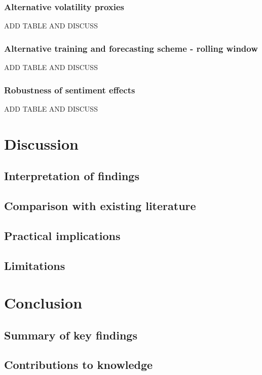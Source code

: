 \documentclass[12pt]{report}
\begin{document}
\subsection{Alternative volatility proxies}
%
ADD TABLE AND DISCUSS
\subsection{Alternative training and forecasting scheme - rolling window}
%
ADD TABLE AND DISCUSS
\subsection{Robustness of sentiment effects}
%
ADD TABLE AND DISCUSS

\chapter{Discussion}
\section{Interpretation of findings}
\section{Comparison with existing literature}
\section{Practical implications}
\section{Limitations}


\chapter{Conclusion}

\section{Summary of key findings}
\section{Contributions to knowledge}
\end{document}
